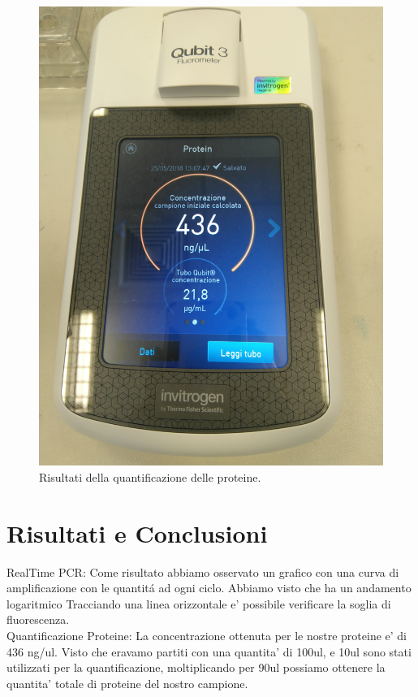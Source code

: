 \documentclass{article}
\begin{document}
\begin{figure}
  \includegraphics[width=\linewidth]{qubit3.jpg}
  \caption{Risultati della quantificazione delle proteine.}
  \label{fig:qubit3}
\end{figure}

\section{Risultati e Conclusioni}
RealTime PCR:
Come risultato abbiamo osservato un grafico con una curva di amplificazione con le quantit\'a ad ogni ciclo.
Abbiamo visto che ha un andamento logaritmico
Tracciando una linea orizzontale e' possibile verificare la soglia di fluorescenza.\\

Quantificazione Proteine:
La concentrazione ottenuta per le nostre proteine e' di 436 ng/ul. Visto che eravamo partiti con una
quantita' di 100ul, e 10ul sono stati utilizzati per la quantificazione, moltiplicando per 90ul possiamo
ottenere la quantita' totale di proteine del nostro campione.
\end{document}
